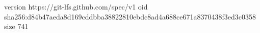 version https://git-lfs.github.com/spec/v1
oid sha256:d84b47aeda8d169cddbba38822810ebdc8ad4a688ce671a8370438f3ed3c0358
size 741

